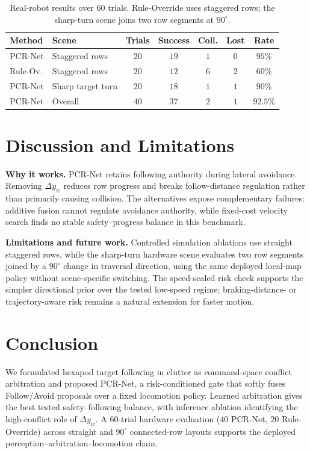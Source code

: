 \documentclass[letterpaper, 10 pt, conference]{ieeeconf}
\begin{document}
\begin{table}[t]
\centering
\caption{Real-robot results over $60$ trials. Rule-Override uses staggered
rows; the sharp-turn scene joins two row segments at $90^\circ$.}
\label{tab:real}
\scriptsize
\begin{tabular*}{\columnwidth}{@{\extracolsep{\fill}}llccccc@{}}
\toprule
Method & Scene & Trials & Success & Coll. & Lost & Rate \\
\midrule
PCR-Net & Staggered rows & $20$ & $19$ & $1$ & $0$ & $95\%$ \\
Rule-Ov. & Staggered rows & $20$ & $12$ & $6$ & $2$ & $60\%$ \\
PCR-Net & Sharp target turn & $20$ & $18$ & $1$ & $1$ & $90\%$ \\
PCR-Net & Overall & $40$ & $37$ & $2$ & $1$ & $92.5\%$ \\
\bottomrule
\end{tabular*}
\end{table}

\section{Discussion and Limitations}
\textbf{Why it works.} PCR-Net retains following authority during lateral
avoidance. Removing $\Delta y_w$ reduces row progress and breaks
follow-distance regulation rather than primarily causing collision. The
alternatives expose complementary failures: additive fusion cannot regulate
avoidance authority, while fixed-cost velocity search finds no stable
safety--progress balance in this benchmark.

\textbf{Limitations and future work.}
Controlled simulation ablations use straight staggered rows, while the
sharp-turn hardware scene evaluates two row segments joined by a $90^\circ$
change in traversal direction, using the same deployed local-map policy
without scene-specific switching. The speed-scaled risk check supports the
simpler directional prior over the tested low-speed regime; braking-distance-
or trajectory-aware risk remains a natural extension for faster motion.

\section{Conclusion}
We formulated hexapod target following in clutter as command-space conflict
arbitration and proposed PCR-Net, a risk-conditioned gate that softly fuses
Follow/Avoid proposals over a fixed locomotion policy. Learned arbitration
gives the best tested safety--following balance, with inference ablation
identifying the high-conflict role of $\Delta y_w$. A $60$-trial hardware
evaluation ($40$ PCR-Net, $20$ Rule-Override) across straight and $90^\circ$
connected-row layouts supports the deployed perception--arbitration--locomotion
chain.
\end{document}

